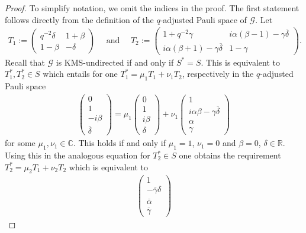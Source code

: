 \documentclass{amsart}
\newcommand{\R}{\mathbb{R}}
\newcommand{\C}{\mathbb{C}}
\begin{document}
\begin{proof}
    To simplify notation, we omit the indices in the proof.
    The first statement follows directly from the definition of the $q$-adjusted Pauli space of $\mathcal{G}$. Let
    \begin{align*}
        T_1 := \begin{pmatrix}
            q^{-2} \delta & 1+\beta \\
            1-\beta & - \delta
        \end{pmatrix}
        \quad \text{ and } \quad 
        T_2 := \begin{pmatrix}
            1+q^{-2} \gamma    & i\alpha(\beta-1)-\gamma\overline{\delta} \\
            i\alpha(\beta+1)-\gamma\overline{\delta} & 1-\gamma
        \end{pmatrix}.
    \end{align*}
    Recall that $\mathcal{G}$ is KMS-undirected if and only if $S^\ast = S$. This is equivalent to $T_1^\ast, T_2^\ast \in S$ which entails for one $T_1^\ast = \mu_1 T_1 + \nu_1 T_2$, respectively in the $q$-adjusted Pauli space
    \begin{align*}
        \begin{pmatrix}
            0 \\ 1 \\ -i \beta \\ \overline{\delta}
        \end{pmatrix}
        = \mu_1 \begin{pmatrix}
            0 \\ 1 \\ i \beta \\ \delta
        \end{pmatrix}
        + \nu_1 \begin{pmatrix}
            1 \\ i \alpha \beta - \gamma \overline{\delta} \\ \alpha \\ \gamma
        \end{pmatrix}
    \end{align*}
    for some $\mu_1, \nu_1 \in \C$. This holds if and only if $\mu_1=1$, $\nu_1=0$ and $\beta = 0$, $\delta \in \R$. Using this in the analogous equation for $T_2^\ast \in S$ one obtains the requirement
    $T_2^\ast = \mu_2 T_1 + \nu_2 T_2$
    which is equivalent to
    \begin{align*}
        \begin{pmatrix}
            1 \\ -\overline{\gamma}\delta \\ \overline{\alpha} \\ \overline{\gamma}

\end{pmatrix}
\end{align*}
\end{proof}
\end{document}
